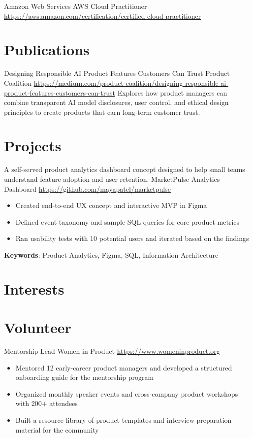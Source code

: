 \documentclass[a4paper, serif, 10pt]{moderncv}
\begin{document}
        {Amazon Web Services}
        {AWS Cloud Practitioner}
        {\url{https://aws.amazon.com/certification/certified-cloud-practitioner}}
        {}
        {}
\section{Publications}

        {Designing Responsible AI Product Features Customers Can Trust}
        {Product Coalition}
        {\url{https://medium.com/product-coalition/designing-responsible-ai-product-features-customers-can-trust}}
        {}
        {Explores how product managers can combine transparent AI model disclosures, user control, and ethical design principles to create products that earn long-term customer trust.}
\section{Projects}

        {A self-served product analytics dashboard concept designed to help small teams understand feature adoption and user retention.}
        {MarketPulse Analytics Dashboard}
        {\url{https://github.com/mayapatel/marketpulse}}
        {}
        {\begin{itemize}
\item Created end-to-end UX concept and interactive MVP in Figma
\item Defined event taxonomy and sample SQL queries for core product metrics
\item Ran usability tests with 10 potential users and iterated based on the findings
\end{itemize}
\textbf{Keywords}: Product Analytics, Figma, SQL, Information Architecture}
\section{Interests}

\section{Volunteer}

        {Mentorship Lead}
        {Women in Product}
        {\url{https://www.womeninproduct.org}}
        {}
        {\begin{itemize}
\item Mentored 12 early-career product managers and developed a structured onboarding guide for the mentorship program
\item Organized monthly speaker events and cross-company product workshops with 200+ attendees
\item Built a resource library of product templates and interview preparation material for the community
\end{itemize}}
    
\end{document}
